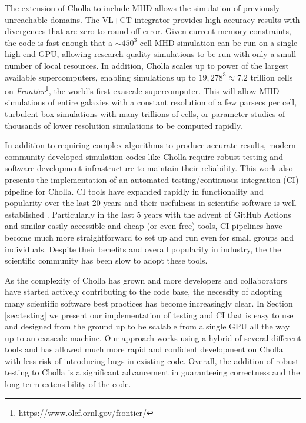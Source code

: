 The extension of Cholla to include MHD allows the simulation of previously unreachable domains. The VL+CT integrator provides high accuracy results with divergences that are zero to round off error. Given current memory constraints, the code is fast enough that a $\sim450^3$ cell MHD simulation can be run on a single high end GPU, allowing research-quality simulations to be run with only a small number of local resources. In addition, Cholla scales up to power of the largest available supercomputers, enabling simulations up to $19,278^3 \approx 7.2$ trillion cells on \textit{Frontier}\footnote{https://www.olcf.ornl.gov/frontier/}, the world's first exascale supercomputer. This will allow MHD simulations of entire galaxies with a constant resolution of a few parsecs per cell, turbulent box simulations with many trillions of cells, or parameter studies of thousands of lower resolution simulations to be computed rapidly.

In addition to requiring complex algorithms to produce accurate results, modern community-developed simulation codes like Cholla require robust testing and software-development infrastructure to maintain their reliability. This work also presents the implementation of an automated testing/continuous integration (CI) pipeline for Cholla. CI tools have expanded rapidly in functionality and popularity over the last 20 years and their usefulness in scientific software is well established \citep{beck_1999, wilson_2014,wilson_2017}. Particularly in the last 5 years with the advent of GitHub Actions and similar easily accessible and cheap (or even free) tools, CI pipelines have become much more straightforward to set up and run even for small groups and individuals. Despite their benefits and overall popularity in industry, the the scientific community has been slow to adopt these tools.

As the complexity of Cholla has grown and more developers and collaborators have started actively contributing to the code base, the necessity of adopting many scientific software best practices has become increasingly clear. In Section \ref{sec:testing} we present our implementation of testing and CI that is easy to use and designed from the ground up to be scalable from a single GPU all the way up to an exascale machine. Our approach works using a hybrid of several different tools and has allowed much more rapid and confident development on Cholla with less risk of introducing bugs in existing code. Overall, the addition of robust testing to Cholla is a significant advancement in guaranteeing correctness and the long term extensibility of the code.

